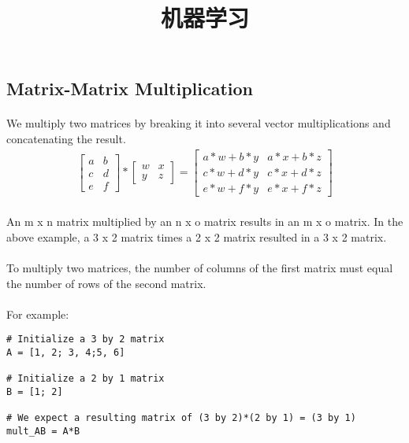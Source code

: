 \documentclass{article}
\begin{document}
\begin{CJK}{UTF8}{gbsn}

\title{机器学习}
\date{}
\maketitle
\section{Matrix-Matrix Multiplication}
\paragraph{}
We multiply two matrices by breaking it into several vector multiplications and concatenating the result.
\begin{eqnarray*}
\left[\begin{array}{cc}
a&b\\
c&d\\
e&f
\end{array}\right]*
\left[\begin{array}{cc}
w&x\\
y&z
\end{array}\right]=
\left[\begin{array}{cc}
a*w+b*y&a*x+b*z\\
c*w+d*y&c*x+d*z\\
e*w+f*y&e*x+f*z
\end{array}\right]
\end{eqnarray*}
\paragraph{}
An m x n matrix multiplied by an n x o matrix results in an m x o matrix. In the above example, a 3 x 2 matrix times a 2 x 2 matrix resulted in a 3 x 2 matrix.
\paragraph{}
To multiply two matrices, the number of columns of the first matrix must equal the number of rows of the second matrix.
\paragraph{}
For example:
\begin{verbatim}
# Initialize a 3 by 2 matrix 
A = [1, 2; 3, 4;5, 6]

# Initialize a 2 by 1 matrix 
B = [1; 2] 

# We expect a resulting matrix of (3 by 2)*(2 by 1) = (3 by 1) 
mult_AB = A*B


\end{verbatim}
\end{CJK}
\end{document}
